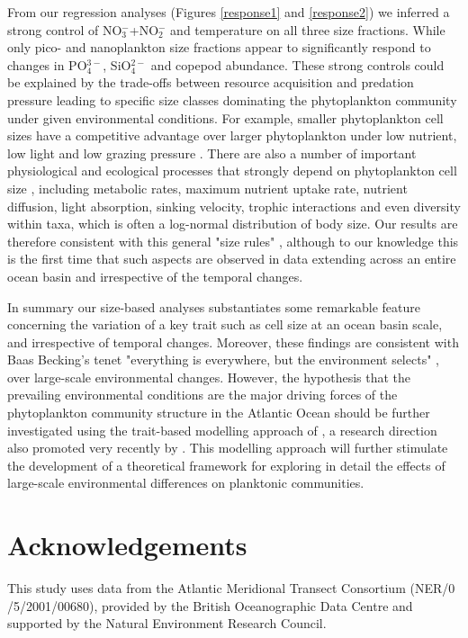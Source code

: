 From our regression analyses (Figures \ref{response1} and \ref{response2}) we inferred a strong control of NO$_3^-$+NO$_2^-$ and temperature on all three size fractions. While only pico- and nanoplankton size fractions appear to significantly respond to changes in PO$_4^{3-}$, SiO$_4^{2-}$ and copepod abundance. These strong controls could be explained by the trade-offs between resource acquisition and predation pressure leading to specific size classes dominating the phytoplankton community under given environmental conditions. For example, smaller phytoplankton cell sizes have a competitive advantage over larger phytoplankton under low nutrient, low light and low grazing pressure \citep{Litchman2008, Litchman2010}. There are also a number of important physiological and ecological processes that strongly depend on phytoplankton cell size \citep{Kiorboe1993, Cermeno2008a, Finkel2009a}, including metabolic rates, maximum nutrient uptake rate, nutrient diffusion, light absorption, sinking velocity, trophic interactions and even diversity within taxa, which  is often a log-normal distribution of body size. Our results are therefore consistent with this general "size rules" \citep{Finkel2009a}, although to our knowledge this is the first time that such aspects are observed in data extending across an entire ocean basin and irrespective of the temporal changes.

In summary our size-based analyses substantiates some remarkable feature concerning the variation of a key trait such as cell size at an ocean basin scale, and irrespective of temporal changes. Moreover, these findings are consistent with Baas Becking's tenet "everything is everywhere, but the environment selects" \citep{BaasBecking1934, DeWit2006,O'Malley2007}, over large-scale environmental changes. However, the hypothesis that the prevailing environmental conditions are the major driving forces of the phytoplankton community structure in the Atlantic Ocean should be further investigated using the trait-based modelling approach of  \citet{Bruggeman2007, Merico2009}, a research direction also promoted very recently by \citet{Follows2011}. This modelling approach will further stimulate the development of a theoretical framework for exploring in detail the effects of large-scale environmental differences on planktonic communities.

\section{Acknowledgements}
This study uses data from the Atlantic Meridional Transect Consortium (NER/0\\/5/2001/00680), provided by the British Oceanographic Data Centre and supported by the Natural Environment Research Council. 
